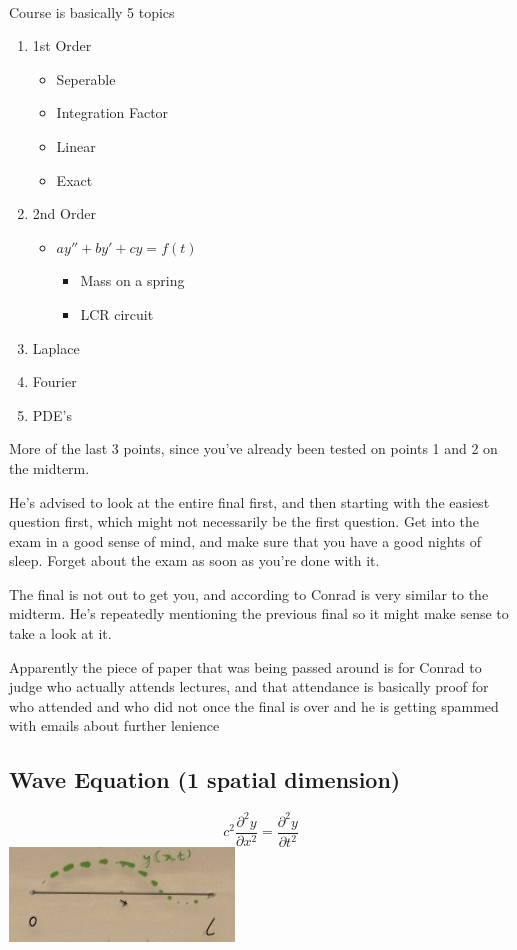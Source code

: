 \documentclass[11pt]{article}
\theoremstyle{definition}
\newcommand{\pd}{{\partial}}
\newcommand*{\pdt}[2]{\frac{\pd^2{#1}}{\pd{#2}^2}}
\begin{document}
\\
Course is basically 5 topics
\begin{enumerate}[noitemsep, topsep=-10pt]
    \item 1st Order
    \begin{itemize}[noitemsep]
        \item Seperable
        \item Integration Factor
        \item Linear
        \item Exact
    \end{itemize}
    \item 2nd Order
    \begin{itemize}[noitemsep]
        \item $ay'' + by' + cy = f(t)$
        \begin{itemize}[noitemsep]
            \item Mass on a spring
            \item LCR circuit
        \end{itemize}
    \end{itemize}
    \item Laplace
    \item Fourier
    \item PDE's
\end{enumerate}
More of the last 3 points, since you've already been tested on points 1 and 2 on the midterm. 

He's advised to look at the entire final first, and then starting with the easiest question first, which might not necessarily be the first question. Get into the exam in a good sense of mind, and make sure that you have a good nights of sleep. Forget about the exam as soon as you're done with it. 

The final is not out to get you, and according to Conrad is very similar to the midterm. He's repeatedly mentioning the previous final so it might make sense to take a look at it.

Apparently the piece of paper that was being passed around is for Conrad to judge who actually attends lectures, and that attendance is basically proof for who attended and who did not once the final is over and he is getting spammed with emails about further lenience
\newpage
\subsection{Wave Equation (1 spatial dimension)} 
$$ c^2\pdt{y}{x} = \pdt{y}{t}$$
\includegraphics[]{wave.jpg}
\end{document}
